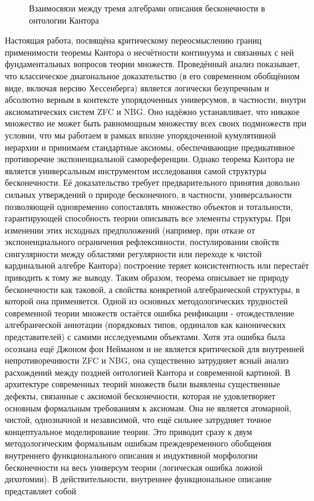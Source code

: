 \documentclass[12pt]{article}
\begin{document}
\begin{figure}[htbp]
\caption{Взаимосвязи между тремя алгебрами описания бесконечности в онтологии Кантора}
\label{fig:three-algebras}
\end{figure}

Настоящая работа, посвящёна критическому переосмыслению границ применимости теоремы Кантора о несчётности континуума и связанных с ней фундаментальных вопросов теории множеств. Проведённый анализ показывает, что классическое диагональное доказательство (в его современном обобщённом виде, включая версию Хессенберга) является логически безупречным и абсолютно верным в контексте упорядоченных универсумов, в частности, внутри аксиоматических систем ZFC и NBG. Оно надёжно устанавливает, что никакое множество не может быть равномощным множеству всех своих подмножеств при условии, что мы работаем в рамках вполне упорядоченной кумулятивной иерархии и принимаем стандартные аксиомы, обеспечивающие предикативное противоречие экспоненциальной самореференции. Однако теорема Кантора не является универсальным инструментом исследования самой структуры бесконечности. Её доказательство требует предварительного принятия довольно сильных утверждений о природе бесконечного, в частности, универсальности позволяющей одновременно сопоставлять множество объектов и тотальности, гарантирующей способность теории описывать все элементы структуры. При изменении этих исходных предположений (например, при отказе от экспоненциального ограничения рефлексивности, постулировании свойств сингулярности между областями регулярности или переходе к чистой кардинальной алгебре Кантора) построение теряет консистентность или перестаёт приводить к тому же выводу. Таким образом, теорема описывает не природу бесконечности как таковой, а свойства конкретной алгебраической структуры, в которой она применяется. Одной из основных методологических трудностей современной теории множеств остаётся ошибка реификации - отождествление алгебраической аннотации (порядковых типов, ординалов как канонических представителей) с самими исследуемыми объектами. Хотя эта ошибка была осознана ещё Джоном фон Нейманом и не является критической для внутренней непротиворечивости ZFC и NBG, она существенно затрудняет ясный анализ расхождений между поздней онтологией Кантора и современной картиной. В архитектуре современных теорий множеств были выявлены существенные дефекты, связанные с аксиомой бесконечности, которая не удовлетворяет основным формальным требованиям к аксиомам. Она не является атомарной, чистой, однозначной и независимой, что ещё сильнее затрудняет точное концептуальное моделирование теории. Это приводит сразу к двум методологическим формальным ошибкам преждевременного обобщения внутреннего функционального описания и индуктивной морфологии бесконечности на весь универсум теории (логическая ошибка ложной дихотомии). В действительности, внутреннее функциональное описание представляет собой 
\end{document}
